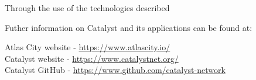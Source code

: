 Through the use of the technologies described

Futher information on Catalyst and its applications can be found at: \\
\begin{center}
Atlas City website - \url{https://www.atlascity.io/} \\
Catalyst website - \url{https://www.catalystnet.org/}\\
Catalyst GitHub - \url{https://www.github.com/catalyst-network}\\
\end{center}